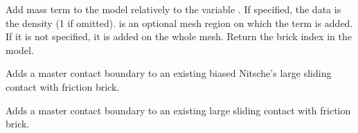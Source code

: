 \documentclass[a4paper,11pt,english]{sphinxmanual}
\begin{document}
\begin{fulllineitems}
\begin{fulllineitems}
Add mass term to the model relatively to the variable .
If specified, the data  is the
density (1 if omitted).  is an optional mesh region on
which the term is added. If it is not specified, it
is added on the whole mesh. Return the brick index in the model.

\end{fulllineitems}


\begin{fulllineitems}
\label{\detokenize{python/cmdref_Model:getfem.Model.add_master_contact_boundary_to_biased_Nitsche_large_sliding_contact_brick}}
Adds a master contact boundary to an existing biased Nitsche’s large sliding contact
with friction brick.

\end{fulllineitems}


\begin{fulllineitems}
\label{\detokenize{python/cmdref_Model:getfem.Model.add_master_contact_boundary_to_large_sliding_contact_brick}}
Adds a master contact boundary to an existing large sliding contact
with friction brick.

\end{fulllineitems}



\end{fulllineitems}
\end{document}
